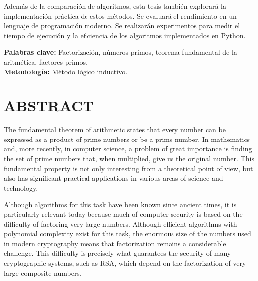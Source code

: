 Además de la comparación de algoritmos, esta tesis también explorará la implementación práctica de estos métodos. Se evaluará el rendimiento en un lenguaje de programación moderno. Se realizarán experimentos para medir el tiempo de ejecución y la eficiencia de los algoritmos implementados en Python.



\textbf{Palabras clave:} Factorización, números primos, teorema fundamental de la aritmética, factores primos.\\
\textbf{Metodología:} Método lógico inductivo.

\clearpage
\chapter*{\centering \normalsize ABSTRACT}
The fundamental theorem of arithmetic states that every number can be expressed as a product of prime numbers or be a prime number. In mathematics and, more recently, in computer science, a problem of great importance is finding the set of prime numbers that, when multiplied, give us the original number. This fundamental property is not only interesting from a theoretical point of view, but also has significant practical applications in various areas of science and technology.

Although algorithms for this task have been known since ancient times, it is particularly relevant today because much of computer security is based on the difficulty of factoring very large numbers. Although efficient algorithms with polynomial complexity exist for this task, the enormous size of the numbers used in modern cryptography means that factorization remains a considerable challenge. This difficulty is precisely what guarantees the security of many cryptographic systems, such as RSA, which depend on the factorization of very large composite numbers.

